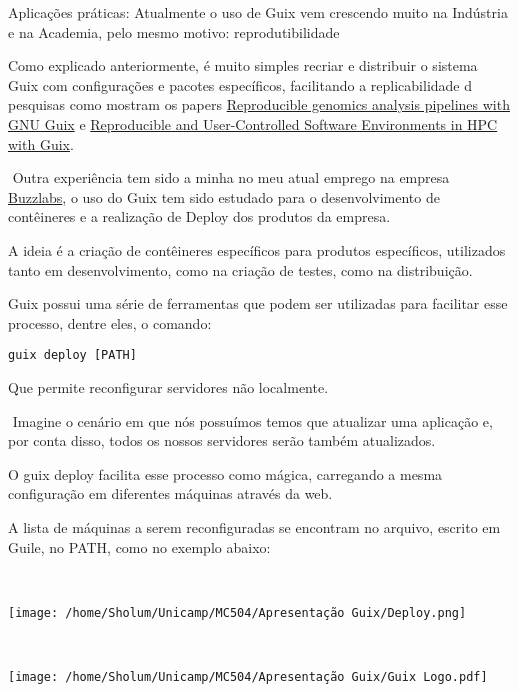 \documentclass[bigger]{beamer}
\begin{document}
\begin{frame}[label={sec:orga9c5198}]{Aplicações práticas:}
Atualmente o uso de Guix vem crescendo muito na Indústria e na Academia, pelo mesmo motivo: reprodutibilidade

Como explicado anteriormente, é muito simples recriar e distribuir o sistema Guix com configurações e pacotes
específicos, facilitando a replicabilidade d pesquisas como mostram os papers
\href{https://www.biorxiv.org/content/10.1101/298653v2}{Reproducible genomics analysis pipelines with GNU Guix} e
\href{https://inria.hal.science/hal-01161771/en}{Reproducible and User-Controlled Software Environments in HPC with Guix}.
\end{frame}
\begin{frame}[label={sec:org5a8f814},fragile]{⁤}
 Outra experiência tem sido a minha no meu atual emprego na empresa \href{https://www.buzzlabs.com.br/}{Buzzlabs}, o uso do Guix tem sido estudado
para o desenvolvimento de contêineres e a realização de Deploy dos produtos da empresa.

A ideia é a criação de contêineres específicos para produtos específicos, utilizados tanto em desenvolvimento,
como na criação de testes, como na distribuição.

Guix possui uma série de ferramentas que podem ser utilizadas para facilitar esse processo, dentre eles, o
comando:
\begin{verbatim}
guix deploy [PATH]
\end{verbatim}
Que permite reconfigurar servidores não localmente.
\end{frame}
\begin{frame}[label={sec:org5d511c5}]{⁤}
Imagine o cenário em que nós possuímos temos que atualizar uma aplicação e, por conta disso, todos os nossos
servidores serão também atualizados.

O guix deploy facilita esse processo como mágica, carregando a mesma configuração em diferentes máquinas
através da web.

A lista de máquinas a serem reconfiguradas se encontram no arquivo, escrito em Guile, no PATH, como no exemplo
abaixo:
\end{frame}
\begin{frame}[label={sec:org851d22b}]{⁤}
\begin{center}
\texttt{[image: /home/Sholum/Unicamp/MC504/Apresentação Guix/Deploy.png]}
\end{center}
\end{frame}
\begin{frame}[label={sec:orgb1c4a83}]{⁤}
\begin{center}
\texttt{[image: /home/Sholum/Unicamp/MC504/Apresentação Guix/Guix Logo.pdf]}
\end{center}
\end{frame}
\end{document}
